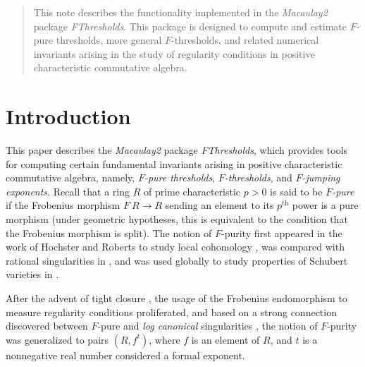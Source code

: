 \documentclass{amsart}
\begin{document}
\begin{abstract}
   This note describes the functionality implemented in the \emph{Macaulay2} package \emph{FThresholds}.
   This package is designed to compute and estimate $F$-pure thresholds, more general $F$-thresholds, and related numerical invariants arising in the study of regularity conditions in positive characteristic commutative algebra.
\end{abstract}




\maketitle

\section{Introduction}

This paper describes the \emph{Macaulay2} \cite{M2} package \emph{FThresholds}, which provides tools for computing certain fundamental invariants arising in positive characteristic commutative algebra, namely, \emph{$F$-pure thresholds}, \emph{$F$-thresholds}, and \emph{$F$-jumping exponents}.
Recall that a ring $R$ of prime characteristic $p>0$ is said to be \emph{$F$-pure} if the Frobenius morphism $F \: R \to R$ sending an element to its $p^\text{th}$ power is a pure morphism (under geometric hypotheses, this is equivalent to the condition that the Frobenius morphism is split).
The notion of $F$-purity first appeared in the work \cite{HochsterRobertsFrobeniusLocalCohomology}  of Hochster and Roberts to study local cohomology \cite{HochsterRobertsFrobeniusLocalCohomology}, was compared with rational singularities in  \cite{FedderFPureRat}, and was used globally to study properties of Schubert varieties in \cite{MehtaRamanathanFrobeniusSplittingAndCohomologyVanishing}.

After the advent of tight closure \cite{HochsterHunekeTC1}, the usage of the Frobenius endomorphism to measure regularity conditions proliferated, and based on a strong connection discovered between $F$-pure and \emph{log canonical} singularities \cite{HaraWatanabeFRegFPure}, the notion of $F$-purity was generalized to pairs $(R, f^t)$, where $f$ is an element of $R$, and $t$ is a nonnegative real number considered a formal exponent.
\end{document}
